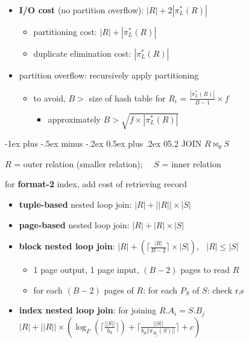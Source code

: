 \documentclass[10pt, landscape]{article}
\makeatletter
\renewcommand{\section}{\@startsection{section}{1}{0mm}%
  {-1ex plus -.5ex minus -.2ex}%
  {0.5ex plus .2ex}%
{\normalfont\large\bfseries}}
\makeatother
\begin{document}
\begin{multicols*}{4}
  \begin{itemize}
    \item \textbf{I/O cost} (no partition overflow): $|R| + 2|\pi^*_L(R)|$
      \begin{itemize}
        \item partitioning cost: $|R| + |\pi^*_L(R)|$
        \item duplicate elimination cost: $|\pi^*_L(R)|$
      \end{itemize}
    \item partition overflow: recursively apply partitioning
      \begin{itemize}
        \item to avoid, $B>$ size of hash table for $R_i$ = $\frac{|\pi^*_L(R)|}{B-1} \times f$
          \begin{itemize}
            \item  approximately $B> \sqrt{f\times |\pi^*_L(R)|}$
          \end{itemize}
      \end{itemize}
  \end{itemize}

  \section{05.2 JOIN $R \bowtie_\theta S$}

  $R$ = outer relation (smaller relation); $\quad S$ = inner relation

  \attention for \textbf{format-2} index, add cost of retrieving record

  \begin{itemize}
    \item \textbf{tuple-based} nested loop join: $|R| + ||R|| \times |S|$
    \item \textbf{page-based} nested loop join: $|R| + |R| \times |S|$
    \item \textbf{block nested loop join}: $|R| + ( \lceil \frac{|R|}{B-2} \rceil \times |S| )$, $\;\; |R|\leq|S|$
      \begin{itemize}
        \item 1 page output, 1 page input, $(B-2)$ pages to read $R$
        \item for each $(B-2)$ pages of $R$: for each $P_S$ of $S$: check r,s
      \end{itemize}
    \item \textbf{index nested loop join}: for joining $R.A_i = S.B_j$
      $|R| + ||R|| \times \left( \log_F(\lceil \frac{||S||}{b_d} \rceil ) + \lceil \frac{||S||}{b_d ||\pi_{B_j}(S)||} \rceil + c \right)$
  \end{itemize}


\end{multicols*}
\end{document}
